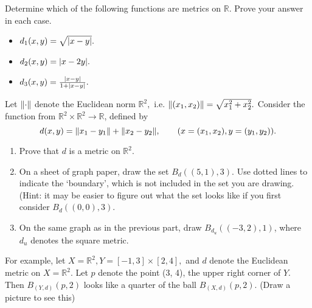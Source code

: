 \documentclass[12pt,letterpaper,boxed]{hmcpset}
\DeclarePairedDelimiter\abs{\lvert}{\rvert}
\DeclarePairedDelimiter{\norm}{\lVert}{\rVert}
\begin{document}
\begin{solution}

\end{solution}

\begin{problem}[Exercise 2.4.]
Determine which of the following functions are metrics on $\mathbb{R}$. Prove your answer in each case.
\vspace{-2mm}
\begin{itemize}
	\itemsep0em
	\item $d_1(x,y)=\sqrt{\abs{x - y}}.$
	\item $d_2(x,y)=\abs{x - 2y}.$
	\item $d_3(x,y)=\frac{\abs{x - y}}{1 + \abs{x - y}}.$
\end{itemize}
\end{problem}
\begin{solution}

\end{solution}

\begin{problem}[Exercise 2.6.]
Let $\norm{\cdot}$ denote the Euclidean norm $\mathbb{R}^{2},$ i.e. $\norm{(x_1, x_2)} = \sqrt{x_1^{2} + x_2^{2}}.$ Consider the function from $\mathbb{R}^{2} \times \mathbb{R}^{2} \rightarrow \mathbb{R}$, defined by $$d(x, y) = \norm{x_1 - y_1} + \norm{x_2 - y_2}, \quad \quad (x = (x_1, x_2), y = (y_1, y_2)). $$
\vspace{-2mm}
\begin{enumerate}
	\itemsep0em
	\item Prove that $d$ is a metric on $\mathbb{R}^{2}.$
	\item On a sheet of graph paper, draw the set $B_{d}((5, 1), 3).$ Use dotted lines to indicate the ‘boundary’,
which is not included in the set you are drawing. (Hint: it may be easier to figure out what the
set looks like if you first consider $B_{d}((0, 0), 3).$
	\item On the same graph as in the previous part, draw $B_{d_{u}}((-3, 2),1)$, where $d_{u}$ denotes the square metric.
\end{enumerate}
\end{problem}
\begin{solution}

\end{solution}

\begin{problem}[Exercise 2.7.]
For example, let $X=\mathbb{R}^{2}, Y = [-1, 3] \times [2, 4],$ and $d$ denote the Euclidean metric on $X = \mathbb{R}^{2}$. Let $p$ denote the point (3, 4), the upper right corner of $Y$. Then $B_{(Y,d)}(p,2)$ looks like a quarter of the ball $B_{(X,d)}(p,2).$ (Draw a picture to see this)
\end{problem}
\begin{solution}

\end{solution}
\end{document}
